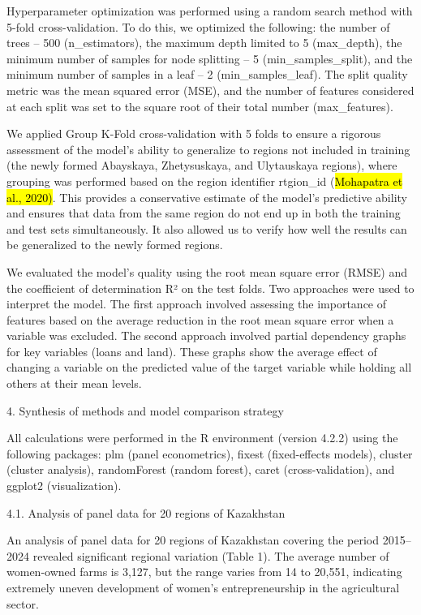 \documentclass[
]{article}
\begin{document}
Hyperparameter optimization was performed using a random search method
with 5-fold cross-validation. To do this, we optimized the following:
the number of trees -- 500 (n\_estimators), the maximum depth limited to
5 (max\_depth), the minimum number of samples for node splitting -- 5
(min\_samples\_split), and the minimum number of samples in a leaf -- 2
(min\_samples\_leaf). The split quality metric was the mean squared
error (MSE), and the number of features considered at each split was set
to the square root of their total number (max\_features).

We applied Group K-Fold cross-validation with 5 folds to ensure a
rigorous assessment of the model's ability to generalize to regions not
included in training (the newly formed Abayskaya, Zhetysuskaya, and
Ulytauskaya regions), where grouping was performed based on the region
identifier rtgion\_id (\hl{Mohapatra et al., 2020)}. This provides a
conservative estimate of the model's predictive ability and ensures that
data from the same region do not end up in both the training and test
sets simultaneously. It also allowed us to verify how well the results
can be generalized to the newly formed regions.

We evaluated the model's quality using the root mean square error (RMSE)
and the coefficient of determination R² on the test folds. Two
approaches were used to interpret the model. The first approach involved
assessing the importance of features based on the average reduction in
the root mean square error when a variable was excluded. The second
approach involved partial dependency graphs for key variables (loans and
land). These graphs show the average effect of changing a variable on
the predicted value of the target variable while holding all others at
their mean levels.

4. Synthesis of methods and model comparison strategy

All calculations were performed in the R environment (version 4.2.2)
using the following packages: plm (panel econometrics), fixest
(fixed-effects models), cluster (cluster analysis), randomForest (random
forest), caret (cross-validation), and ggplot2 (visualization).

4.1. Analysis of panel data for 20 regions of Kazakhstan

An analysis of panel data for 20 regions of Kazakhstan covering the
period 2015--2024 revealed significant regional variation (Table 1). The
average number of women-owned farms is 3,127, but the range varies from
14 to 20,551, indicating extremely uneven development of women's
entrepreneurship in the agricultural sector.
\end{document}
